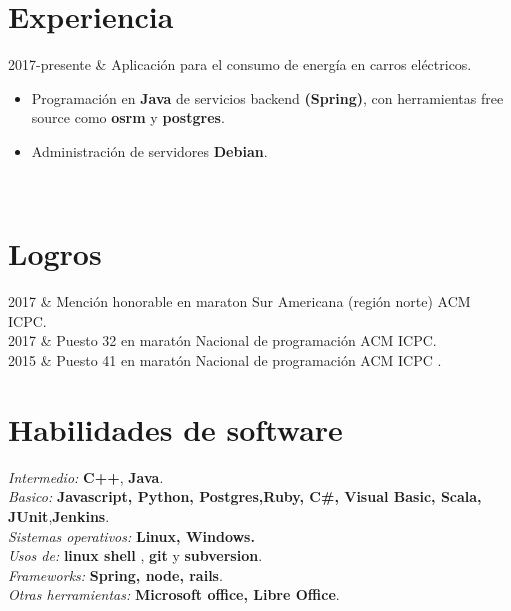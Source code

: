 \documentclass[
    changecolor={111, 156, 45}, 
]{cv-roald}
\begin{document}
\section*{Experiencia}
\begin{tabularcv}
2017-presente   &   
                \newline Aplicación para el consumo de energía en carros eléctricos.
                \begin{itemize}
                  \item Programación en \textbf{Java} de servicios backend \textbf{(Spring)}, con herramientas free source como \textbf{osrm} y \textbf{postgres}.
                  \item Administración de servidores \textbf{Debian}.
                \end{itemize} 
                \\
                
\end{tabularcv}   

\section*{Logros}
\begin{tabularcv}	
2017    &   Mención honorable en maraton Sur Americana (región norte) ACM ICPC. \\
2017	&	Puesto 32 en maratón Nacional de programación ACM ICPC.  \\
2015    &   Puesto 41 en maratón Nacional de programación ACM ICPC  .  \\

                
\end{tabularcv}

\section*{Habilidades de software}
	\textit{Intermedio:}  \textbf{C++}, \textbf{Java}.\\
	\textit{Basico:} \textbf{Javascript, Python, Postgres,Ruby, C\#, Visual Basic, Scala,}  \textbf{JUnit},\textbf{Jenkins}.\\
	\textit{Sistemas operativos:} \textbf{Linux, Windows.}\\
	\textit{Usos de:} \textbf{linux shell} , \textbf{git} y \textbf{subversion}.\\
	\textit{Frameworks:} \textbf{Spring, node, rails}. \\
	\textit{Otras herramientas:} \textbf{Microsoft office, Libre Office}.
\end{document}
